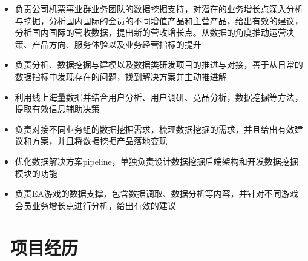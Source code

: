 \documentclass{resume}
\begin{document}
\begin{itemize}
  \item 负责公司机票事业群业务团队的数据挖掘支持，对潜在的业务增长点深入分析与挖掘，分析国内国际的会员的不同增值产品和主营产品，给出有效的建议，分析国内国际的营收数据，提出新的营收增长点。从数据的角度推动运营决策、产品方向、服务体验以及业务经营指标的提升
  \item 负责分析、数据挖掘与建模以及数据类研发项目的推进与对接，善于从日常的数据指标中发现存在的问题，找到解决方案并主动推进解
  \item 利用线上海量数据并结合用户分析、用户调研、竞品分析，数据挖掘等方法，提取有效信息辅助决策
  \item 负责对接不同业务组的数据挖掘需求，梳理数据挖掘的需求，并且给出有效建议和方案，并且将数据挖掘产品落地变现
\end{itemize}

\begin{itemize}
  \item 优化数据解决方案pipeline，单独负责设计数据挖掘后端架构和开发数据挖掘模块的功能
\end{itemize}

\begin{itemize}
  \item 负责EA游戏的数据支撑，包含数据调取、数据分析等内容，并针对不同游戏会员业务增长点进行分析，给出有效的建议
\end{itemize}



\section{\faUsers\ 项目经历}
\end{document}
